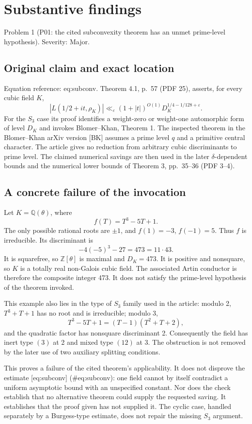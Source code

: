 \documentclass[10pt]{article}
\begin{document}
\section*{Substantive findings}
Problem 1 (P01: the cited subconvexity theorem has an unmet prime-level hypothesis).  Severity: Major.\par
\subsection*{Original claim and exact location}
Equation reference: eq:subconv. Theorem 4.1, p. 57 (PDF 25), asserts, for every cubic field \(K\), \[
 |L(1/2+it,\rho_K)|
 \ll_{\varepsilon}(1+|t|)^{O(1)}D_K^{1/4-1/128+\varepsilon}.\] For the \(S_3\) case its proof identifies a weight-zero or weight-one automorphic form of level \(D_K\) and invokes Blomer–Khan, Theorem 1. The inspected theorem in the Blomer–Khan arXiv version [BK] assumes a prime level \(q\) and a primitive central character. The article gives no reduction from arbitrary cubic discriminants to prime level. The claimed numerical savings are then used in the later \(\delta\)-dependent bounds and the numerical lower bounds of Theorem 3, pp. 35–36 (PDF 3–4).\par
\subsection*{A concrete failure of the invocation}
Let \(K=\mathbb Q(\theta)\), where \[f(T)=T^3-5T+1.\] The only possible rational roots are \(\pm1\), and \(f(1)=-3\), \(f(-1)=5\). Thus \(f\) is irreducible. Its discriminant is \[-4(-5)^3-27=473=11\cdot43.\] It is squarefree, so \(\mathbb Z[\theta]\) is maximal and \(D_K=473\). It is positive and nonsquare, so \(K\) is a totally real non-Galois cubic field. The associated Artin conductor is therefore the composite integer 473. It does not satisfy the prime-level hypothesis of the theorem invoked.\par
This example also lies in the type of \(S_3\) family used in the article: modulo 2, \(T^3+T+1\) has no root and is irreducible; modulo 3, \[T^3-5T+1=(T-1)(T^2+T+2),\] and the quadratic factor has nonsquare discriminant 2. Consequently the field has inert type \((3)\) at 2 and mixed type \((12)\) at 3. The obstruction is not removed by the later use of two auxiliary splitting conditions.\par
This proves a failure of the cited theorem’s applicability. It does not disprove the estimate [eq:subconv] (\#eq:subconv): one field cannot by itself contradict a uniform asymptotic bound with an unspecified constant. Nor does the check establish that no alternative theorem could supply the requested saving. It establishes that the proof given has not supplied it. The cyclic case, handled separately by a Burgess-type estimate, does not repair the missing \(S_3\) argument.\par
\end{document}
